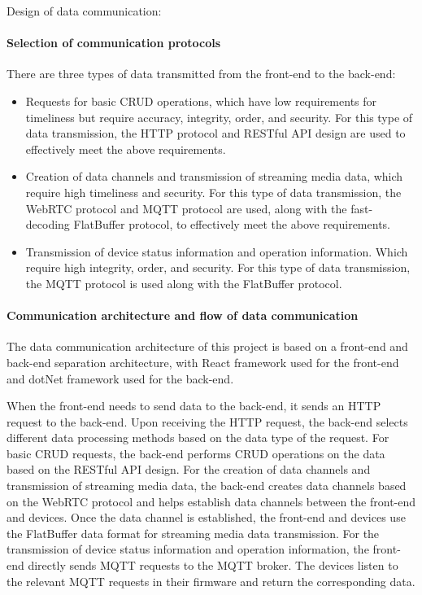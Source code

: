 Design of data communication:

\paragraph{Selection of communication protocols}

There are three types of data transmitted from the front-end to the back-end: 
\begin{itemize}
    \item Requests for basic CRUD operations, which have low requirements for timeliness but require accuracy, integrity, order, and security. 
    For this type of data transmission, the HTTP protocol and RESTful API design are used to effectively meet the above requirements.
    \item Creation of data channels and transmission of streaming media data, which require high timeliness and security. 
    For this type of data transmission, the WebRTC protocol and MQTT protocol are used, along with the fast-decoding FlatBuffer protocol, 
    to effectively meet the above requirements.
    \item Transmission of device status information and operation information. 
    Which require high integrity, order, and security. 
    For this type of data transmission, the MQTT protocol is used along with the FlatBuffer protocol.
\end{itemize}



\paragraph{Communication architecture and flow of data communication}

The data communication architecture of this project is based on a front-end and back-end separation architecture, 
with React framework used for the front-end and dotNet framework used for the back-end.

When the front-end needs to send data to the back-end, it sends an HTTP request to the back-end.
Upon receiving the HTTP request, the back-end selects different data processing methods based on the data type of the request. 
For basic CRUD requests, the back-end performs CRUD operations on the data based on the RESTful API design. 
For the creation of data channels and transmission of streaming media data, 
the back-end creates data channels based on the WebRTC protocol and helps establish data channels 
between the front-end and devices. Once the data channel is established, the front-end and devices 
use the FlatBuffer data format for streaming media data transmission.
For the transmission of device status information and operation information, 
the front-end directly sends MQTT requests to the MQTT broker. 
The devices listen to the relevant MQTT requests in their firmware and return the corresponding data.

